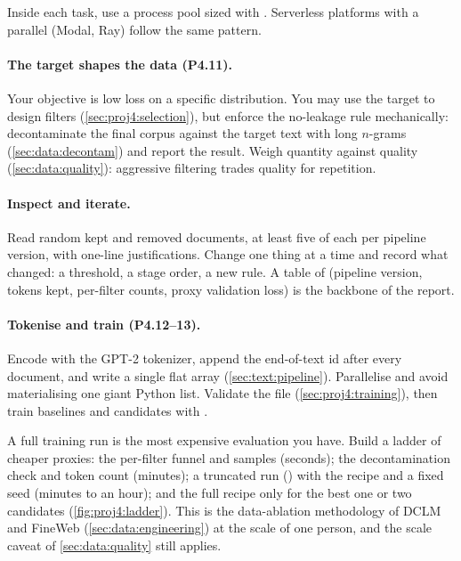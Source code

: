 \noindent Inside each task, use a process pool sized with .
Serverless platforms with a parallel  (Modal, Ray) follow the same pattern.

\paragraph{The target shapes the data (P4.11).} Your objective is low loss on a specific distribution.
You may use the target to design filters (\cref{sec:proj4:selection}), but enforce the no-leakage rule
mechanically: decontaminate the final corpus against the target text with long $n$-grams
(\cref{sec:data:decontam}) and report the result. Weigh quantity against quality
(\cref{sec:data:quality}): aggressive filtering trades quality for repetition.

\paragraph{Inspect and iterate.} Read random kept and removed documents, at least five of each per
pipeline version, with one-line justifications. Change one thing at a time and record what changed: a
threshold, a stage order, a new rule. A table of (pipeline version, tokens kept, per-filter counts,
proxy validation loss) is the backbone of the report.

\paragraph{Tokenise and train (P4.12--13).} Encode with the GPT-2 tokenizer, append the end-of-text
id after every document, and write a single flat  array (\cref{sec:text:pipeline}).
Parallelise and avoid materialising one giant Python list. Validate the file
(\cref{sec:proj4:training}), then train baselines and candidates with .

\begin{systemslens}
A full training run is the most expensive evaluation you have. Build a ladder of cheaper proxies:
the per-filter funnel and samples (seconds); the decontamination check and token count (minutes); a
truncated run () with the  recipe and a fixed seed (minutes to an hour);
and the full recipe only for the best one or two candidates (\cref{fig:proj4:ladder}). This is the
data-ablation methodology of DCLM and FineWeb (\cref{sec:data:engineering}) at the scale of one
person, and the scale caveat of \cref{sec:data:quality} still applies.
\end{systemslens}

